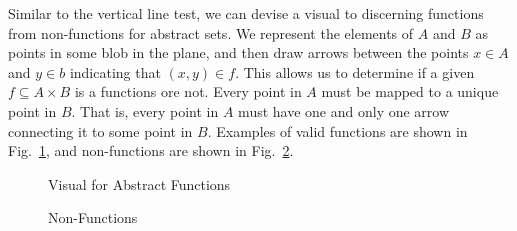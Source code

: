         \par\vspace{2.5ex}
        Similar to the vertical line test, we can
        devise a visual to discerning functions from non-functions for abstract
        sets. We represent the elements of $A$ and $B$ as points in some blob
        in the plane, and then draw arrows between the points
        $x\in{A}$ and $y\in{b}$ indicating that $(x,y)\in{f}$. This allows us to
        determine if a given $f\subseteq{A}\times{B}$ is a functions ore not.
        Every point in $A$ must be mapped to a unique point in $B$. That is,
        every point in $A$ must have one and only one arrow connecting it to
        some point in $B$. Examples of valid functions are shown in
        Fig.~\ref{fig:Abstract_Functions}, and non-functions are shown in
        Fig.~\ref{fig:Abstract_Non_Functions}.
        \begin{figure}[H]
            \centering
            \begin{subfigure}[b]{0.49\textwidth}
                \centering
                \resizebox{\textwidth}{!}{%
                    
                }
            \end{subfigure}
            \begin{subfigure}[b]{0.49\textwidth}
                \centering
                \resizebox{\textwidth}{!}{%
                    
                }
            \end{subfigure}
            \caption{Visual for Abstract Functions}
            \label{fig:Abstract_Functions}
        \end{figure}
        \begin{figure}[H]
            \centering
            \begin{subfigure}[b]{0.49\textwidth}
                \centering
                \resizebox{\textwidth}{!}{%
                    
                }
            \end{subfigure}
            \begin{subfigure}[b]{0.49\textwidth}
                \centering
                \resizebox{\textwidth}{!}{%
                    
                }
            \end{subfigure}
            \caption{Non-Functions}
            \label{fig:Abstract_Non_Functions}
        \end{figure}
